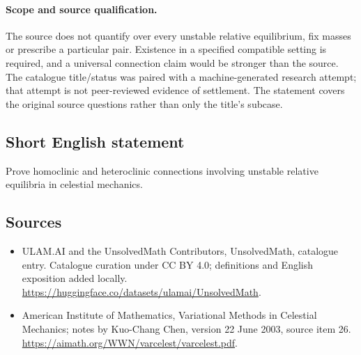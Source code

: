 \documentclass[11pt]{article}
\begin{document}
\paragraph{Scope and source qualification.}The source does not quantify over every unstable relative equilibrium, fix masses or prescribe a particular pair. Existence in a specified compatible setting is required, and a universal connection claim would be stronger than the source. The catalogue title/status was paired with a machine-generated research attempt; that attempt is not peer-reviewed evidence of settlement. The statement covers the original source questions rather than only the title’s subcase.
\subsection{Short English statement}
Prove homoclinic and heteroclinic connections involving unstable relative equilibria in celestial mechanics.
\subsection{Sources}
\begin{itemize}
\item[\hypertarget{source:statement:1}{S1}] ULAM.AI and the UnsolvedMath Contributors, UnsolvedMath, catalogue entry. Catalogue curation under CC BY 4.0; definitions and English exposition added locally.
\url{https://huggingface.co/datasets/ulamai/UnsolvedMath}.
\item[\hypertarget{source:statement:2}{S2}] American Institute of Mathematics, Variational Methods in Celestial Mechanics; notes by Kuo-Chang Chen, version 22 June 2003, source item 26.
\url{https://aimath.org/WWN/varcelest/varcelest.pdf}.
\end{itemize}
\label{end:statement}
\end{document}

